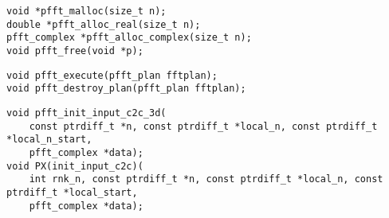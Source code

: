 \begin{lstlisting}
void *pfft_malloc(size_t n);
double *pfft_alloc_real(size_t n);
pfft_complex *pfft_alloc_complex(size_t n);
void pfft_free(void *p);
\end{lstlisting}

\begin{lstlisting}
void pfft_execute(pfft_plan fftplan);
void pfft_destroy_plan(pfft_plan fftplan);
\end{lstlisting}

\begin{lstlisting}
void pfft_init_input_c2c_3d(
    const ptrdiff_t *n, const ptrdiff_t *local_n, const ptrdiff_t *local_n_start,
    pfft_complex *data);
void PX(init_input_c2c)(
    int rnk_n, const ptrdiff_t *n, const ptrdiff_t *local_n, const ptrdiff_t *local_start,
    pfft_complex *data);
\end{lstlisting}

